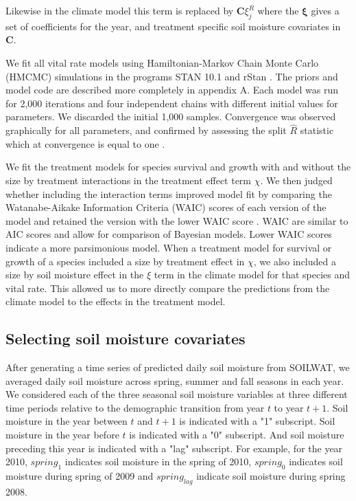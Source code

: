 \documentclass[11pt]{article}
\begin{document}
\begin{doublespace}
Likewise in the climate model this term is replaced by $\boldsymbol{C}\xi_{j}^R$ where the $\boldsymbol{\xi}$ gives a set of coefficients for the year, and treatment specific soil moisture covariates in $\boldsymbol{C}$.

We fit all vital rate models using Hamiltonian-Markov Chain Monte Carlo (HMCMC) simulations in the programs STAN 10.1 and rStan \citep{}. The priors and model code are described more completely in appendix A. Each model was run for 2,000 iterations and four independent chains with different initial values for parameters. We discarded the initial 1,000 samples. Convergence was observed graphically for all parameters, and confirmed by assessing the split $\widehat{R}$ statistic which at convergence is equal to one \citep{}. 

We fit the treatment models for species survival and growth with and without the size by treatment interactions in the treatment effect term $\chi$. We then judged whether including the interaction terms improved model fit by comparing the Watanabe-Aikake Information Criteria (WAIC) scores of each version of the model and retained the version with the lower WAIC score \citep{vetari_practical_2015}. WAIC are similar to AIC scores and allow for comparison of Bayesian models. Lower WAIC scores indicate a more parsimonious model. When a treatment model for survival or growth of a species included a size by treatment effect in $\chi$, we also included a size by soil moisture effect in the $\xi$ term in the climate model for that species and vital rate. This allowed us to more directly compare the predictions from the climate model to the effects in the treatment model.

\subsection*{Selecting soil moisture covariates}

After generating a time series of predicted daily soil moisture from SOILWAT, we averaged daily soil moisture across spring, summer and fall seasons in each year. We considered each of the three seasonal soil moisture variables at three different time periods relative to the demographic transition from year $t$ to year $t+1$.  Soil moisture in the year between $t$ and $t+1$ is indicated with a "1" subscript.  Soil moisture in the year before $t$ is indicated with a "0" subscript. And soil moisture preceding this year is indicated with a "lag" subscript. For example, for the year 2010, $spring_1$ indicates soil moisture in the spring of 2010, $spring_0$ indicates soil moisture during spring of 2009 and $spring_{lag}$ indicate soil moisture during spring 2008.   


\end{doublespace}
\end{document}
